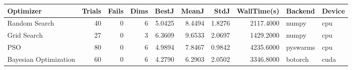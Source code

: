 \begin{tabular}{lrrrrrrrll}
\toprule
Optimizer & Trials & Fails & Dims & BestJ & MeanJ & StdJ & WallTime(s) & Backend & Device \\
\midrule
Random Search & 40 & 0 & 6 & 5.0425 & 8.4494 & 1.8276 & 2117.4000 & numpy & cpu \\
Grid Search & 27 & 0 & 3 & 6.3609 & 9.6533 & 2.0697 & 1429.2000 & numpy & cpu \\
PSO & 80 & 0 & 6 & 4.9894 & 7.8467 & 0.9842 & 4235.6000 & pyswarms & cpu \\
Bayesian Optimization & 60 & 0 & 6 & 4.2790 & 6.2903 & 2.0502 & 3346.8000 & botorch & cuda \\
\bottomrule
\end{tabular}
